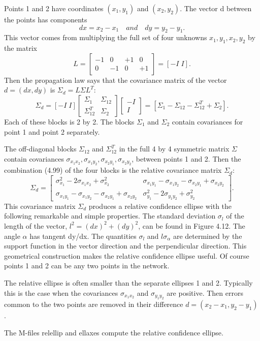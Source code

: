 	Points 1 and 2 have coordinates $(x_1,y_1)$ and $(x_2,y_2)$. The vector d between the
	points has components
	\begin{equation*}
	dx=x_2-x_1  \quad and \quad dy=y_2-y_1.
	\end{equation*}
	This vector comes from multiplying the full set of four unknowns $x_1,y_1,x_2,y_2$ by the
	matrix
	\begin{equation*}
	L=\begin{bmatrix}
	-1 & 0 & +1 & 0 \\
	0 & -1 & 0 & +1 
	\end{bmatrix}
	=
	[-I\;I].
	\end{equation*}
	Then the propagation law says that the covariance matrix of the vector $d=(dx,dy)$ is
	$\Sigma_d=L\Sigma L^T$:
	\begin{equation}
	\Sigma_d=[-I\;I]\begin{bmatrix} \Sigma_1 & \Sigma_{12}\\ \Sigma^T_{12} & \Sigma_2
	\end{bmatrix}
	\begin{bmatrix}
	-I \\I
	\end{bmatrix}
	=
	[\Sigma_1-\Sigma_{12}-\Sigma^T_{12}+\Sigma_2].
	\end{equation} 
	Each of these blocks is 2 by 2. The blocks $\Sigma_1$ and $\Sigma_2$ contain covariances for point 1 and point 2 separately.
	
	The off-diagonal blocks $\Sigma_{12}$ and $\Sigma^T_{12}$ in the full 4 by 4 symmetric matrix $\Sigma$ contain covariances $\sigma_{x_1x_2},\sigma_{x_1y_2},\sigma_{x_2y_1},\sigma_{x_2y_2}$, between points 1 and 2. Then the combination (4.99) of the four blocks is the relative covariance matrix $\Sigma_d$:
	\begin{equation}
	\Sigma_d=
	\begin{bmatrix}
	\sigma^2_{x_1}-2\sigma_{x_1x_2}+\sigma^2_{x_2} & \sigma_{x_1y_1}-\sigma_{x_1y_2}-\sigma_{x_2y_1}+\sigma_{x_2y_2}\\
	\sigma_{x_1y_1}-\sigma_{x_1y_2}-\sigma_{x_2y_1}+\sigma_{x_2y_2} &
	\sigma^2_{y_1}-2\sigma_{y_1y_2}+\sigma^2_{y_2}
	\end{bmatrix}.
	\end{equation}
	This covariance matrix $\Sigma_d$ produces a relative confidence ellipse with the following 
	remarkable and simple properties. The standard deviation $\sigma_l$ of the length of the vector,
	$l^2=(dx)^2+(dy)^2$, can be found in Figure 4.12. The angle $\alpha$ has tangent dy/dx. The
	quantities $\sigma_l$ and $l\sigma_\alpha$ are determined by the support function in the vector direction and the perpendicular direction. This geometrical construction makes the relative confidence ellipse useful. Of course points 1 and 2 can be any two points in the network.
	
	The relative ellipse is often smaller than the separate ellipses 1 and 2. Typically this
	is the case when the covariances $\sigma_{x_1x_2}$ and $\sigma_{y_1y_2}$ are positive. Then errors common to the two points are removed in their difference $d=(x_2-x_1,y_2-y_1)$.
	
	The M-files relellip and ellaxes compute the relative confidence ellipse.
	
	 